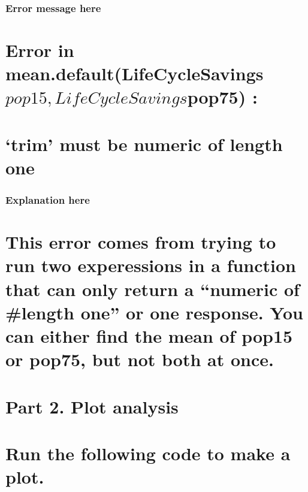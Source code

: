 \documentclass[]{article}
\begin{document}
\subsubsection{Error message here}\label{error-message-here-2}

\section{\texorpdfstring{Error in
mean.default(LifeCycleSavings\(pop15, LifeCycleSavings\)pop75)
:}{Error in mean.default(LifeCycleSavingspop15, LifeCycleSavingspop75) :}}\label{error-in-mean.defaultlifecyclesavingspop15-lifecyclesavingspop75}

\section{\texorpdfstring{`trim' must be numeric of length
one}{trim must be numeric of length one}}\label{trim-must-be-numeric-of-length-one}

\subsubsection{Explanation here}\label{explanation-here-2}

\section{\texorpdfstring{This error comes from trying to run two
experessions in a function that can only return a ``numeric of \#length
one'' or one response. You can either find the mean of pop15 or pop75,
but not both at
once.}{This error comes from trying to run two experessions in a function that can only return a numeric of \#length one or one response. You can either find the mean of pop15 or pop75, but not both at once.}}\label{this-error-comes-from-trying-to-run-two-experessions-in-a-function-that-can-only-return-a-numeric-of-length-one-or-one-response.-you-can-either-find-the-mean-of-pop15-or-pop75-but-not-both-at-once.}

\section{Part 2. Plot analysis}\label{part-2.-plot-analysis}

\section{Run the following code to make a
plot.}\label{run-the-following-code-to-make-a-plot.}
\end{document}
